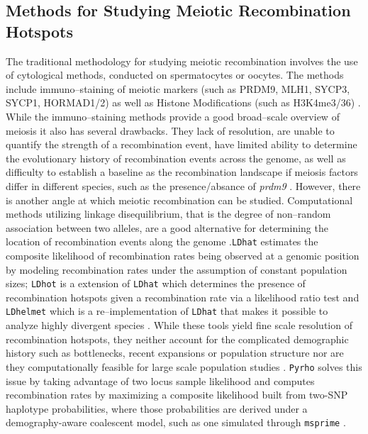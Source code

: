 \documentclass[12pt,a4paper]{article}
\begin{document}
\subsection{Methods for Studying Meiotic Recombination Hotspots}
The traditional methodology for studying meiotic recombination involves the use of cytological methods, conducted on spermatocytes or oocytes. The methods include immuno--staining of meiotic markers (such as PRDM9, MLH1, SYCP3, SYCP1, HORMAD1/2) as well as Histone Modifications (such as H3K4me3/36) \parencite{lee_ewsr1_2019, parvanov_prdm9_2016, lam_cell-type-specific_2019, hinch_configuration_2020, pigozzi_chromosomes_2016}. While the immuno--staining methods provide a good broad--scale overview of meiosis it also has several drawbacks. They lack of resolution, are unable to quantify the strength of a recombination event, have limited ability to determine the evolutionary history of recombination events across the genome, as well as difficulty to establish a baseline as the recombination landscape if meiosis factors differ in different species, such as the presence/absance of \textit{prdm9} \parencite{pigozzi_chromosomes_2016, baudat_meiotic_2013}. However, there is another angle at which meiotic recombination can be studied. Computational methods utilizing linkage disequilibrium, that is the degree of non--random association between two alleles, are a good alternative for determining the location of recombination events along the genome \parencite{10.1093/molbev/msae112, mcvean_genealogical_2002}.\texttt{LDhat} estimates the composite likelihood of recombination rates being observed at a genomic position by modeling recombination rates under the assumption of constant population sizes; \texttt{LDhot} is a extension of \texttt{LDhat} which determines the presence of recombination hotspots given a recombination rate via a likelihood ratio test and \texttt{LDhelmet} which is a re--implementation of \texttt{LDhat} that makes it possible to analyze highly divergent species \parencite{slatkin_linkage_2008, 10.1093/genetics/160.3.1231, auton_recombination_2007, 10.1371/journal.pgen.1003090}. While these tools yield fine scale resolution of recombination hotspots, they neither account for the complicated demographic history such as bottlenecks, recent expansions or population structure nor are they computationally feasible for large scale population studies \parencite{doi:10.1126/sciadv.aaw9206}. \texttt{Pyrho} solves this issue by taking advantage of two locus sample likelihood and computes recombination rates by maximizing a composite likelihood built from two-SNP haplotype probabilities, where those probabilities are derived under a demography-aware coalescent model, such as one simulated through \texttt{msprime} \parencite{doi:10.1126/sciadv.aaw9206, baumdicker_efficient_2022}.
\end{document}
